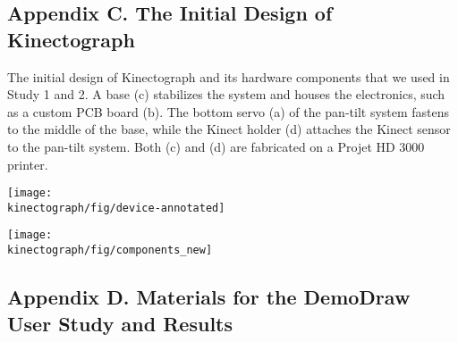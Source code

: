 \begin{appendices}

\clearpage


\subsection{Appendix C. The Initial Design of Kinectograph}
\label{kinectograph_original_design}

The initial design of Kinectograph and its hardware components that we used in Study 1 and 2. A base (c) stabilizes the system and houses the electronics, such as a custom PCB board (b). The bottom servo (a) of the pan-tilt system fastens to the middle of the base, while the Kinect holder (d) attaches the Kinect sensor to the pan-tilt system. Both (c) and (d) are fabricated on a Projet HD 3000 printer.

\centering
\vspace{20pt}
\texttt{[image: \\kinectograph/fig/device-annotated]}

\texttt{[image: \\kinectograph/fig/components\_new]}

\clearpage


\subsection{Appendix D. Materials for the DemoDraw User Study and Results}
\label{demodraw_study_materials}


\end{appendices}
